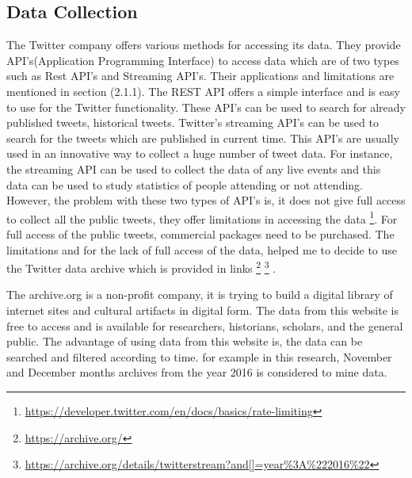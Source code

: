 \subsection{Data Collection}
The Twitter company offers various methods for accessing its data. They provide API's(Application Programming Interface) to access data which are of two types such as Rest API's and Streaming API's. Their applications and limitations are mentioned in section (2.1.1). The REST API offers a simple interface and is easy to use for the Twitter functionality. These API's can be used to search for already published tweets, historical tweets. Twitter's streaming API's can be used to search for the tweets which are published in current time. This API's are usually used in an innovative way to collect a huge number of tweet data. For instance, the streaming API can be used to collect the data of any live events and this data can be used to study statistics of people attending or not attending. However, the problem with these two types of API's is, it does not give full access to collect all the public tweets, they offer limitations in accessing the data \footnote{\url{https://developer.twitter.com/en/docs/basics/rate-limiting}}. For full access of the public tweets, commercial packages need to be purchased. The limitations and for the lack of full access of the data, helped me to decide to use the Twitter data archive which is provided in links \footnote{\url{https://archive.org/}} \footnote{\url{https://archive.org/details/twitterstream?and[]=year\%3A\%222016\%22}} \cite{Twitterarchive}. 

The archive.org is a non-profit company, it is trying to build a digital library of internet sites and cultural artifacts in digital form. The data from this website is free to access and is available for researchers, historians, scholars, and the general public. The advantage of using data from this website is, the data can be searched and filtered according to time. for example in this research, November and December months archives from the year 2016 is considered to mine data. 

